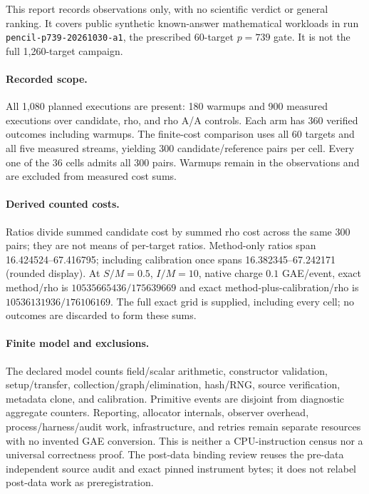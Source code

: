 This report records observations only, with no scientific verdict or general ranking. It covers public synthetic known-answer mathematical workloads in run \texttt{pencil-p739-20261030-a1}, the prescribed 60-target $p=739$ gate. It is not the full 1,260-target campaign.

\paragraph{Recorded scope.} All 1,080 planned executions are present: 180 warmups and 900 measured executions over candidate, rho, and rho A/A controls. Each arm has 360 verified outcomes including warmups. The finite-cost comparison uses all 60 targets and all five measured streams, yielding 300 candidate/reference pairs per cell. Every one of the 36 cells admits all 300 pairs. Warmups remain in the observations and are excluded from measured cost sums.

\paragraph{Derived counted costs.} Ratios divide summed candidate cost by summed rho cost across the same 300 pairs; they are not means of per-target ratios. Method-only ratios span 16.424524--67.416795; including calibration once spans 16.382345--67.242171 (rounded display). At $S/M=0.5$, $I/M=10$, native charge $0.1$ GAE/event, exact method/rho is $10535665436/175639669$ and exact method-plus-calibration/rho is $10536131936/176106169$. The full exact grid is supplied, including every cell; no outcomes are discarded to form these sums.

\paragraph{Finite model and exclusions.} The declared model counts field/scalar arithmetic, constructor validation, setup/transfer, collection/graph/elimination, hash/RNG, source verification, metadata clone, and calibration. Primitive events are disjoint from diagnostic aggregate counters. Reporting, allocator internals, observer overhead, process/harness/audit work, infrastructure, and retries remain separate resources with no invented GAE conversion. This is neither a CPU-instruction census nor a universal correctness proof. The post-data binding review reuses the pre-data independent source audit and exact pinned instrument bytes; it does not relabel post-data work as preregistration.

